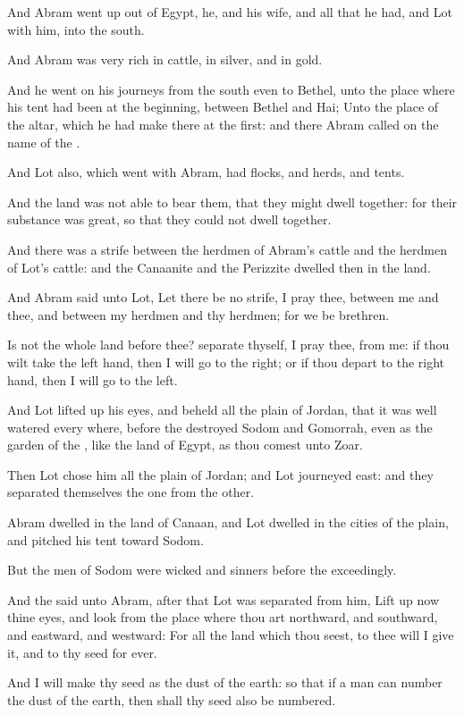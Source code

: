 \verse And Abram went up out of Egypt, he, and his wife, and all that he had, and Lot with him, into the south.

\verse And Abram was very rich in cattle, in silver, and in gold.

\verse And he went on his journeys from the south even to Bethel, unto the place where his tent had been at the beginning, between Bethel and Hai; \verse Unto the place of the altar, which he had make there at the first: and there Abram called on the name of the \LORD.

\verse And Lot also, which went with Abram, had flocks, and herds, and tents.

\verse And the land was not able to bear them, that they might dwell together: for their substance was great, so that they could not dwell together.

\verse And there was a strife between the herdmen of Abram's cattle and the herdmen of Lot's cattle: and the Canaanite and the Perizzite dwelled then in the land.

\verse And Abram said unto Lot, Let there be no strife, I pray thee, between me and thee, and between my herdmen and thy herdmen; for we be brethren.

\verse Is not the whole land before thee? separate thyself, I pray thee, from me: if thou wilt take the left hand, then I will go to the right; or if thou depart to the right hand, then I will go to the left.

\verse And Lot lifted up his eyes, and beheld all the plain of Jordan, that it was well watered every where, before the \LORD destroyed Sodom and Gomorrah, even as the garden of the \LORD, like the land of Egypt, as thou comest unto Zoar.

\verse Then Lot chose him all the plain of Jordan; and Lot journeyed east: and they separated themselves the one from the other.

\verse Abram dwelled in the land of Canaan, and Lot dwelled in the cities of the plain, and pitched his tent toward Sodom.

\verse But the men of Sodom were wicked and sinners before the \LORD exceedingly.

\verse And the \LORD said unto Abram, after that Lot was separated from him, Lift up now thine eyes, and look from the place where thou art northward, and southward, and eastward, and westward: \verse For all the land which thou seest, to thee will I give it, and to thy seed for ever.

\verse And I will make thy seed as the dust of the earth: so that if a man can number the dust of the earth, then shall thy seed also be numbered.

